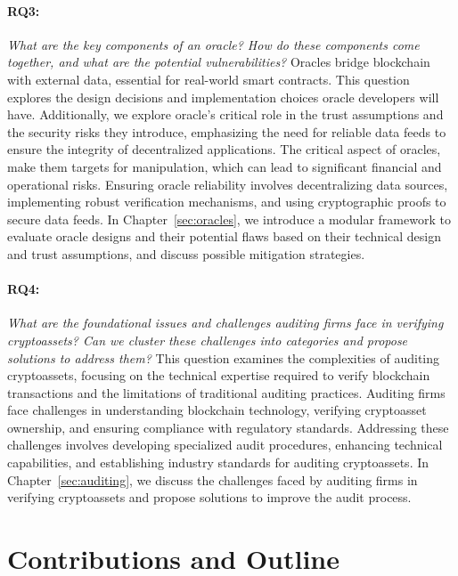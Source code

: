 \paragraph{RQ3:} \textit{What are the key components of an oracle? How do these components come together, and what are the potential vulnerabilities?}
Oracles bridge blockchain with external data, essential for real-world smart contracts. This question explores the design decisions and implementation choices oracle developers will have. Additionally, we explore oracle's critical role in the trust assumptions and the security risks they introduce, emphasizing the need for reliable data feeds to ensure the integrity of decentralized applications. The critical aspect of oracles, make them targets for manipulation, which can lead to significant financial and operational risks. Ensuring oracle reliability involves decentralizing data sources, implementing robust verification mechanisms, and using cryptographic proofs to secure data feeds. In Chapter~\ref{sec:oracles}, we introduce a modular framework to evaluate oracle designs and their potential flaws based on their technical design and trust assumptions, and discuss possible mitigation strategies.

\paragraph{RQ4:} \textit{What are the foundational issues and challenges auditing firms face in verifying cryptoassets? Can we cluster these challenges into categories and propose solutions to address them?}
This question examines the complexities of auditing cryptoassets, focusing on the technical expertise required to verify blockchain transactions and the limitations of traditional auditing practices. Auditing firms face challenges in understanding blockchain technology, verifying cryptoasset ownership, and ensuring compliance with regulatory standards. Addressing these challenges involves developing specialized audit procedures, enhancing technical capabilities, and establishing industry standards for auditing cryptoassets. In Chapter~\ref{sec:auditing}, we discuss the challenges faced by auditing firms in verifying cryptoassets and propose solutions to improve the audit process.



\section{Contributions and Outline} 

